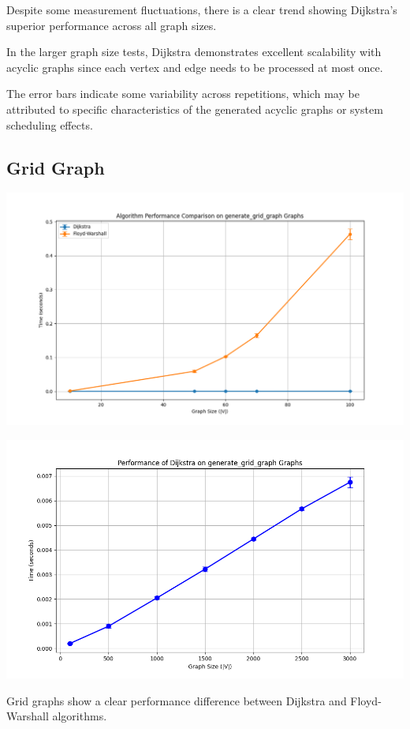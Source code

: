 \documentclass[a4paper,12pt]{article}
\begin{document}
Despite some measurement fluctuations, there is a clear trend showing Dijkstra's superior performance across all graph sizes.

In the larger graph size tests, Dijkstra demonstrates excellent scalability with acyclic graphs since each vertex and edge needs to be processed at most once.

The error bars indicate some variability across repetitions, which may be attributed to specific characteristics of the generated acyclic graphs or system scheduling effects.
\subsection{Grid Graph}
\label{sec:org20c900a}
\begin{center}
\includegraphics[width=.9\linewidth]{dijkstra_floyd_grid.png}
\label{org9ed354d}
\end{center}
\begin{center}
\includegraphics[width=.9\linewidth]{dijkstra_grid.png}
\label{org216adb0}
\end{center}

Grid graphs show a clear performance difference between Dijkstra and Floyd-Warshall algorithms.
\end{document}
